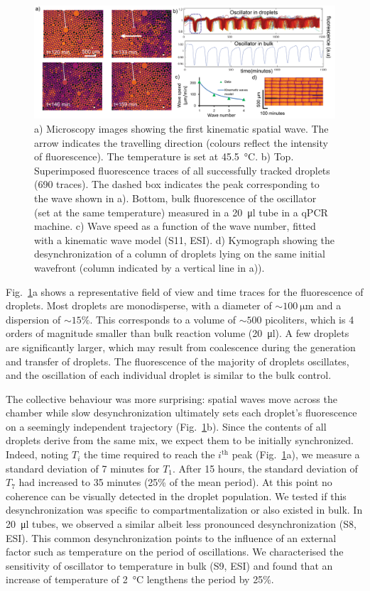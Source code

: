 \documentclass[prl,aps,reprint,
 amsmath,amssymb,superscriptaddress]{revtex4-1}
\begin{document}
\begin{figure}
\includegraphics[width=\textwidth]{oscillations}
\caption{a) Microscopy images showing the first kinematic spatial wave. The arrow indicates the travelling direction (colours reflect the intensity of fluorescence).  The temperature is set at \SI{45.5}{\celsius}. b) Top. Superimposed fluorescence traces of all successfully tracked droplets (690 traces). The dashed box indicates the peak corresponding to the wave shown in a). Bottom, bulk fluorescence of the oscillator (set at the same temperature) measured in a \SI{20}{\micro\litre} tube in a qPCR machine. c) Wave speed as a function of the wave number, fitted with a kinematic wave model (S11, ESI). d) Kymograph showing the desynchronization of a column of droplets lying on the same initial wavefront (column indicated by a vertical line in a)). }
\label{fig:oscillations}
\end{figure}

	Fig.~\ref{fig:oscillations}a shows a representative field of view and time traces for the fluorescence of droplets. Most droplets are monodisperse, with a diameter of $\sim\SI{100}{\micro\metre}$ and a dispersion of $\sim15\%$. This corresponds to a volume of $\sim 500$ picoliters, which is 4 orders of magnitude smaller than bulk reaction volume (\SI{20}{\micro\litre}). A few droplets are significantly larger, which may result from coalescence during the generation and transfer of droplets. The fluorescence of the majority of droplets oscillates, and the oscillation of each individual droplet is similar to the bulk control.
	
	The collective behaviour was more surprising: spatial waves move across the chamber while slow desynchronization ultimately sets each droplet’s fluorescence on a seemingly independent trajectory (Fig.~\ref{fig:oscillations}b). 
Since the contents of all droplets derive from the same mix, we expect them to be initially synchronized. Indeed, noting $T_i$ the time required to reach the $i^\text{th}$ peak (Fig.~\ref{fig:oscillations}a), we measure a standard deviation of 7 minutes for $T_1$. After 15 hours, the standard deviation of $T_7$ had increased to 35 minutes (25\% of the mean period). At this point no coherence can be visually detected in the droplet population. We tested if this desynchronization was specific to compartmentalization or also existed in bulk. In \SI{20}{\micro\litre} tubes, we observed a similar albeit less pronounced desynchronization (S8, ESI). This common desynchronization points to the influence of an external factor such as temperature on the period of oscillations. We characterised the sensitivity of oscillator to temperature in bulk (S9, ESI) and found that an increase of temperature of \SI{2}{\celsius} lengthens the period by 25\%.
\end{document}
